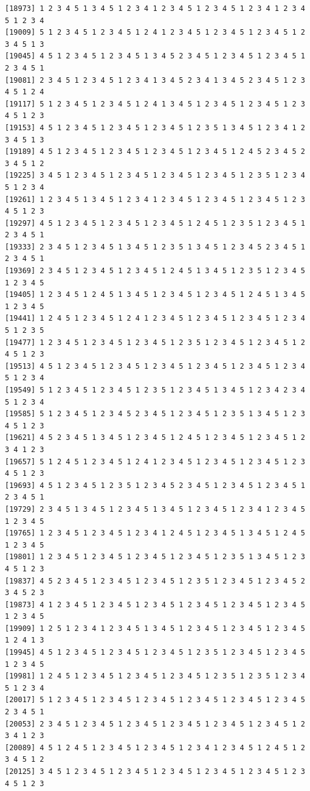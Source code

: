 \documentclass[
  11pt,
]{book}
\begin{document}
\begin{verbatim}
[18973] 1 2 3 4 5 1 3 4 5 1 2 3 4 1 2 3 4 5 1 2 3 4 5 1 2 3 4 1 2 3 4 5 1 2 3 4
[19009] 5 1 2 3 4 5 1 2 3 4 5 1 2 4 1 2 3 4 5 1 2 3 4 5 1 2 3 4 5 1 2 3 4 5 1 3
[19045] 4 5 1 2 3 4 5 1 2 3 4 5 1 3 4 5 2 3 4 5 1 2 3 4 5 1 2 3 4 5 1 2 3 4 5 1
[19081] 2 3 4 5 1 2 3 4 5 1 2 3 4 1 3 4 5 2 3 4 1 3 4 5 2 3 4 5 1 2 3 4 5 1 2 4
[19117] 5 1 2 3 4 5 1 2 3 4 5 1 2 4 1 3 4 5 1 2 3 4 5 1 2 3 4 5 1 2 3 4 5 1 2 3
[19153] 4 5 1 2 3 4 5 1 2 3 4 5 1 2 3 4 5 1 2 3 5 1 3 4 5 1 2 3 4 1 2 3 4 5 1 3
[19189] 4 5 1 2 3 4 5 1 2 3 4 5 1 2 3 4 5 1 2 3 4 5 1 2 4 5 2 3 4 5 2 3 4 5 1 2
[19225] 3 4 5 1 2 3 4 5 1 2 3 4 5 1 2 3 4 5 1 2 3 4 5 1 2 3 5 1 2 3 4 5 1 2 3 4
[19261] 1 2 3 4 5 1 3 4 5 1 2 3 4 1 2 3 4 5 1 2 3 4 5 1 2 3 4 5 1 2 3 4 5 1 2 3
[19297] 4 5 1 2 3 4 5 1 2 3 4 5 1 2 3 4 5 1 2 4 5 1 2 3 5 1 2 3 4 5 1 2 3 4 5 1
[19333] 2 3 4 5 1 2 3 4 5 1 3 4 5 1 2 3 5 1 3 4 5 1 2 3 4 5 2 3 4 5 1 2 3 4 5 1
[19369] 2 3 4 5 1 2 3 4 5 1 2 3 4 5 1 2 4 5 1 3 4 5 1 2 3 5 1 2 3 4 5 1 2 3 4 5
[19405] 1 2 3 4 5 1 2 4 5 1 3 4 5 1 2 3 4 5 1 2 3 4 5 1 2 4 5 1 3 4 5 1 2 3 4 5
[19441] 1 2 4 5 1 2 3 4 5 1 2 4 1 2 3 4 5 1 2 3 4 5 1 2 3 4 5 1 2 3 4 5 1 2 3 5
[19477] 1 2 3 4 5 1 2 3 4 5 1 2 3 4 5 1 2 3 5 1 2 3 4 5 1 2 3 4 5 1 2 4 5 1 2 3
[19513] 4 5 1 2 3 4 5 1 2 3 4 5 1 2 3 4 5 1 2 3 4 5 1 2 3 4 5 1 2 3 4 5 1 2 3 4
[19549] 5 1 2 3 4 5 1 2 3 4 5 1 2 3 5 1 2 3 4 5 1 3 4 5 1 2 3 4 2 3 4 5 1 2 3 4
[19585] 5 1 2 3 4 5 1 2 3 4 5 2 3 4 5 1 2 3 4 5 1 2 3 5 1 3 4 5 1 2 3 4 5 1 2 3
[19621] 4 5 2 3 4 5 1 3 4 5 1 2 3 4 5 1 2 4 5 1 2 3 4 5 1 2 3 4 5 1 2 3 4 1 2 3
[19657] 5 1 2 4 5 1 2 3 4 5 1 2 4 1 2 3 4 5 1 2 3 4 5 1 2 3 4 5 1 2 3 4 5 1 2 3
[19693] 4 5 1 2 3 4 5 1 2 3 5 1 2 3 4 5 2 3 4 5 1 2 3 4 5 1 2 3 4 5 1 2 3 4 5 1
[19729] 2 3 4 5 1 3 4 5 1 2 3 4 5 1 3 4 5 1 2 3 4 5 1 2 3 4 1 2 3 4 5 1 2 3 4 5
[19765] 1 2 3 4 5 1 2 3 4 5 1 2 3 4 1 2 4 5 1 2 3 4 5 1 3 4 5 1 2 4 5 1 2 3 4 5
[19801] 1 2 3 4 5 1 2 3 4 5 1 2 3 4 5 1 2 3 4 5 1 2 3 5 1 3 4 5 1 2 3 4 5 1 2 3
[19837] 4 5 2 3 4 5 1 2 3 4 5 1 2 3 4 5 1 2 3 5 1 2 3 4 5 1 2 3 4 5 2 3 4 5 2 3
[19873] 4 1 2 3 4 5 1 2 3 4 5 1 2 3 4 5 1 2 3 4 5 1 2 3 4 5 1 2 3 4 5 1 2 3 4 5
[19909] 1 2 5 1 2 3 4 1 2 3 4 5 1 3 4 5 1 2 3 4 5 1 2 3 4 5 1 2 3 4 5 1 2 4 1 3
[19945] 4 5 1 2 3 4 5 1 2 3 4 5 1 2 3 4 5 1 2 3 5 1 2 3 4 5 1 2 3 4 5 1 2 3 4 5
[19981] 1 2 4 5 1 2 3 4 5 1 2 3 4 5 1 2 3 4 5 1 2 3 5 1 2 3 5 1 2 3 4 5 1 2 3 4
[20017] 5 1 2 3 4 5 1 2 3 4 5 1 2 3 4 5 1 2 3 4 5 1 2 3 4 5 1 2 3 4 5 2 3 4 5 1
[20053] 2 3 4 5 1 2 3 4 5 1 2 3 4 5 1 2 3 4 5 1 2 3 4 5 1 2 3 4 5 1 2 3 4 1 2 3
[20089] 4 5 1 2 4 5 1 2 3 4 5 1 2 3 4 5 1 2 3 4 1 2 3 4 5 1 2 4 5 1 2 3 4 5 1 2
[20125] 3 4 5 1 2 3 4 5 1 2 3 4 5 1 2 3 4 5 1 2 3 4 5 1 2 3 4 5 1 2 3 4 5 1 2 3

\end{verbatim}
\end{document}
